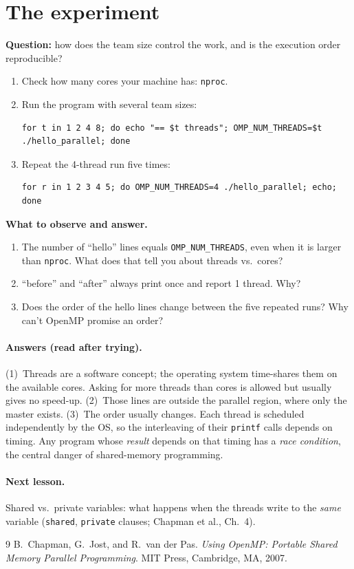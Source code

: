 \documentclass[11pt,a4paper]{article}
\begin{document}
\section{The experiment}
\begin{experiment}
\textbf{Question:} how does the team size control the work, and is the execution order
reproducible?
\begin{enumerate}
  \item Check how many cores your machine has: \texttt{nproc}.
  \item Run the program with several team sizes:
\begin{lstlisting}[style=sh]
for t in 1 2 4 8; do echo "== $t threads"; OMP_NUM_THREADS=$t ./hello_parallel; done
\end{lstlisting}
  \item Repeat the 4-thread run five times:
\begin{lstlisting}[style=sh]
for r in 1 2 3 4 5; do OMP_NUM_THREADS=4 ./hello_parallel; echo; done
\end{lstlisting}
\end{enumerate}
\textbf{What to observe and answer.}
\begin{enumerate}
  \item The number of ``hello'' lines equals \texttt{OMP\_NUM\_THREADS}, even when it is
        larger than \texttt{nproc}. What does that tell you about threads vs.\ cores?
  \item ``before'' and ``after'' always print once and report 1 thread. Why?
  \item Does the order of the hello lines change between the five repeated runs?
        Why can't OpenMP promise an order?
\end{enumerate}
\end{experiment}

\paragraph{Answers (read after trying).}
(1)~Threads are a software concept; the operating system time-shares them on the
available cores. Asking for more threads than cores is allowed but usually gives no
speed-up.
(2)~Those lines are outside the parallel region, where only the master exists.
(3)~The order usually changes. Each thread is scheduled independently by the OS, so the
interleaving of their \texttt{printf} calls depends on timing. Any program whose
\emph{result} depends on that timing has a \emph{race condition}, the central danger of
shared-memory programming.

\paragraph{Next lesson.} Shared vs.\ private variables: what happens when the threads
write to the \emph{same} variable (\texttt{shared}, \texttt{private} clauses; Chapman
et al., Ch.~4).

\begin{thebibliography}{9}
 B.~Chapman, G.~Jost, and R.~van der Pas. \emph{Using OpenMP: Portable
  Shared Memory Parallel Programming}. MIT Press, Cambridge, MA, 2007.
\end{thebibliography}
\end{document}
